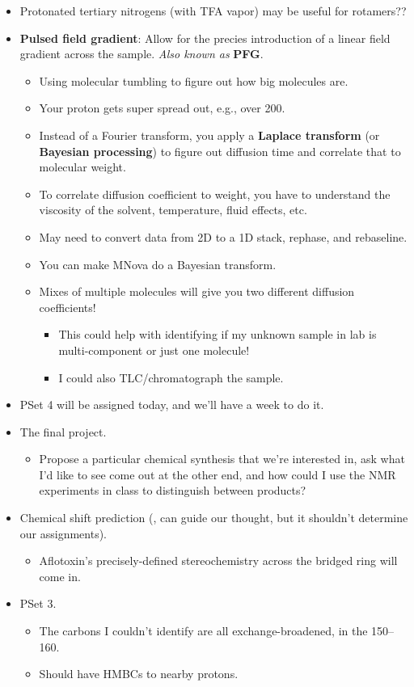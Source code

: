 \documentclass[../notes.tex]{subfiles}
\begin{document}
\begin{itemize}
    \item Protonated tertiary nitrogens (with TFA vapor) may be useful for rotamers??
    \item \textbf{Pulsed field gradient}: Allow for the precies introduction of a linear field gradient across the sample. \emph{Also known as} \textbf{PFG}.
    \begin{itemize}
        \item Using molecular tumbling to figure out how big molecules are.
        \item Your proton gets super spread out, e.g., over \SI{200}{\partspermillion}.
        \item Instead of a Fourier transform, you apply a \textbf{Laplace transform} (or \textbf{Bayesian processing}) to figure out diffusion time and correlate that to molecular weight.
        \item To correlate diffusion coefficient to weight, you have to understand the viscosity of the solvent, temperature, fluid effects, etc.
        \item May need to convert data from 2D to a 1D stack, rephase, and rebaseline.
        \item You can make MNova do a Bayesian transform.
        \item Mixes of multiple molecules will give you two different diffusion coefficients!
        \begin{itemize}
            \item This could help with identifying if my unknown sample in lab is multi-component or just one molecule!
            \item I could also TLC/chromatograph the sample.
        \end{itemize}
    \end{itemize}
    \item PSet 4 will be assigned today, and we'll have a week to do it.
    \item The final project.
    \begin{itemize}
        \item Propose a particular chemical synthesis that we're interested in, ask what I'd like to see come out at the other end, and how could I use the NMR experiments in class to distinguish between products?
    \end{itemize}
    \item Chemical shift prediction (,  can guide our thought, but it shouldn't determine our assignments).
    \begin{itemize}
        \item Aflotoxin's precisely-defined stereochemistry across the bridged ring will come in.
    \end{itemize}
    \item PSet 3.
    \begin{itemize}
        \item The carbons I couldn't identify are all exchange-broadened, in the \SIrange{150}{160}{\partspermillion}.
        \item Should have HMBCs to nearby protons.
    \end{itemize}
\end{itemize}
\end{document}
